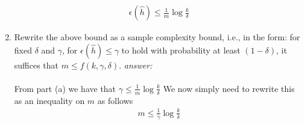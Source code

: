 \documentclass{article}
\begin{document}
\begin{enumerate}[label=(\alph*)]
\begin{align*}
    \epsilon(\hat{h})\leq \frac{1}{m}\log\frac{k}{\delta}
\end{align*}
    \item Rewrite the above bound as a sample complexity bound, i.e., in the form: for fixed $\delta$ and $\gamma$, for $\epsilon(\hat{h}) \leq \gamma$ to hold with probability at least $(1 - \delta)$, it suffices that $m \leq f(k,\gamma,\delta)$.
    \textit{answer:}\\\\
    From part (a) we have that $\gamma \leq \frac{1}{m}\log\frac{k}{\delta}$ We now simply need to rewrite this as an inequality on $m$ as follows
    \begin{align*}
        m \leq \frac{1}{\gamma}\log\frac{k}{\delta}
    \end{align*}
\end{enumerate}
\end{document}
